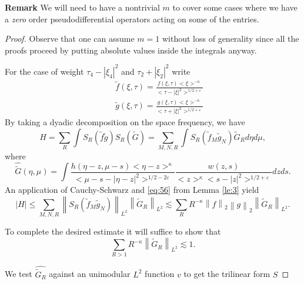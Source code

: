 \documentclass[draft,11pt,leqno]{amsart}
\newcommand{\norm}[2]{{\left\| #1 \right\|}_{#2}}
\newcommand{\ve}{\varepsilon}
\newcommand{\ka}{\kappa}
\newcommand{\tf}{\tilde{f}}
\newcommand{\tg}{\tilde{g}}
\newcommand{\suml}{\sum\limits}
\newcommand{\f}{\displaystyle\frac}
\begin{document}
{\bf Remark} We will need to have a nontrivial $m$ to cover some cases
where we have a {\it zero} order pseudodifferential operators acting on
some of the entries.
\begin{proof}
Observe that one can assume $m=1$ without loss of generality
since all the proofs proceed by putting  absolute values inside the 
integrals anyway.

For the case of weight $\tau_4-|\xi_4|^2$ and $\tau_2+|\xi_2|^2$ write 
\begin{eqnarray*}
& &\tilde{f}(\xi,\tau)=
\f{f(\xi,\tau)<\xi>^{-\ka}}{<\tau-|\xi|^2>^{1/2+\ve}}\\
& &\tilde{g}(\xi,\tau)=
\f{g(\xi,\tau)<\xi>^{-\ka}}
{<\tau+|\xi|^2>^{1/2+\ve}}
\end{eqnarray*}
By taking a dyadic decomposition on the space frequency, we have 
$$
H=\suml_R\int S_R (\tilde{f}\tilde{g}) S_R(\tilde{G})=\suml_{M,N,R}
\int S_R(\tf_M \tg_N) \tilde{G}_R d\eta d\mu,
$$
where
$$
\widehat{\tilde{G}}(\eta,\mu)=\int\f{h(\eta-z,\mu-s)
<\eta-z>^{\ka}}
{<\mu-s-|\eta-z|^2>^{1/2-2\ve}}
 \f{w(z,s)}{<z>^{\ka}
<s-|z|^2>^{1/2+\ve}}dz ds.
$$
An application
of Cauchy-Schwarz and \eqref{eq:56} from Lemma \ref{le:3}  yield
$$
|H|\leq \suml_{M,N,R}\norm{S_R(\tf_M \tg_N)}{L^2}
 \norm{\tilde{G}_R}{L^2}\lesssim 
\suml_R R^{-\ka} \norm{f}{2}\norm{g}{2}\norm{\tilde{G}_R}{L^2}.
$$

To complete the desired estimate  it will suffice to show that
\begin{equation}
\label{eq:17}
\sum_{R>1} R^{-\ka}\norm{\tilde{G}_R}{L^2}\lesssim 1.
\end{equation}

We test $\widehat{\tilde{G}_R}$ against an unimodular $L^2$ function $v$
 to get the trilinear form $S$


\end{proof}
\end{document}
